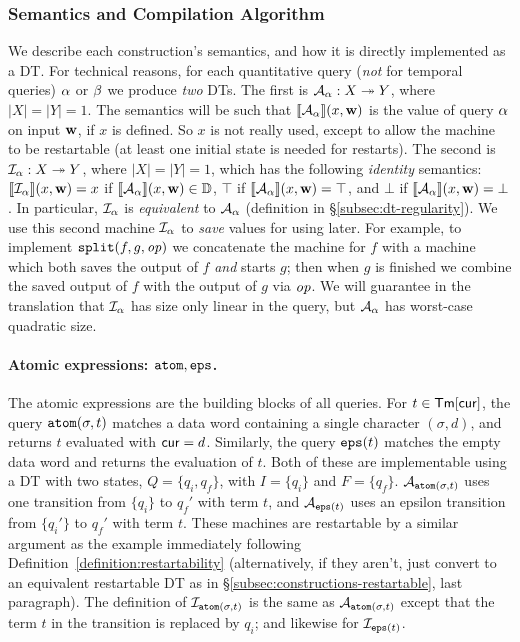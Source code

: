 \subsubsection{Semantics and Compilation Algorithm}
\label{subsec:rm-compilation}

We describe each construction's semantics, and how it is directly implemented as a DT.
For technical reasons, for each quantitative query (\emph{not} for temporal queries) $\alpha$ or $\beta$ we produce \emph{two} DTs. The first is $\mathcal{A}_{\alpha}: X \twoheadrightarrow Y$, where $|X| = |Y| = 1$. The semantics will be such that $\llbracket \mathcal{A}_{\alpha} \rrbracket(x,\textbf{w})$ is the value of query $\alpha$ on input $\textbf{w}$, if $x$ is defined. So $x$ is not really used, except to allow the machine to be restartable (at least one initial state is needed for restarts). The second is $\mathcal{I}_{\alpha}: X \twoheadrightarrow Y$, where $|X|=|Y|=1$, which has the following \emph{identity} semantics: $\llbracket \mathcal{I}_{\alpha} \rrbracket(x,\textbf{w}) = x$ if $\llbracket \mathcal{A}_{\alpha} \rrbracket(x,\textbf{w}) \in \mathbb{D}$, $\top$ if $\llbracket \mathcal{A}_{\alpha} \rrbracket(x,\textbf{w}) = \top$, and $\bot$ if $\llbracket \mathcal{A}_{\alpha} \rrbracket(x,\textbf{w}) = \bot$.
In particular, $\mathcal{I}_{\alpha}$ is \emph{equivalent} to $\mathcal{A}_{\alpha}$ (definition in \S\ref{subsec:dt-regularity}).
We use this second machine $\mathcal{I}_{\alpha}$ to \emph{save} values for using later. For example, to implement $\texttt{split}(f,g,\mathit{op})$ we concatenate the machine for $f$ with a machine which both saves the output of $f$ \emph{and} starts $g$; then when $g$ is finished we combine the saved output of $f$ with the output of $g$ via $\mathit{op}$. We will guarantee in the translation that $\mathcal{I}_{\alpha}$ has size only linear in the query, but $\mathcal{A}_{\alpha}$ has worst-case quadratic size.

\paragraph*{Atomic expressions: $\texttt{atom}, \texttt{eps}$.}
The atomic expressions are the building blocks of all queries. For $t \in \textsf{Tm}[\mathsf{cur}]$, the query $\texttt{atom}(\sigma, t)$ matches a data word containing a single character $(\sigma, d)$, and returns $t$ evaluated with $\mathsf{cur} = d$. Similarly, the query $\texttt{eps}(t)$ matches the empty data word and returns the evaluation of $t$.
Both of these are implementable using a DT with two states, $Q = \{q_i, q_f\}$, with $I = \{q_i\}$ and $F = \{q_f\}$.
$\mathcal{A}_{\texttt{atom}(\sigma, t)}$ uses one transition from $\{q_i\}$ to $q_f'$ with term $t$, and $\mathcal{A}_{\texttt{eps}(t)}$ uses an epsilon transition from $\{q_i'\}$ to $q_f'$ with term $t$.
These machines are restartable by a similar argument as the example immediately following Definition~\ref{definition:restartability} (alternatively, if they aren't, just convert to an equivalent restartable DT as in \S\ref{subsec:constructions-restartable}, last paragraph). 
The definition of $\mathcal{I}_{\texttt{atom}(\sigma, t)}$ is the same as $\mathcal{A}_{\texttt{atom}(\sigma, t)}$ except that the term $t$ in the transition is replaced by $q_i$; and likewise for $\mathcal{I}_{\texttt{eps}(t)}$.

